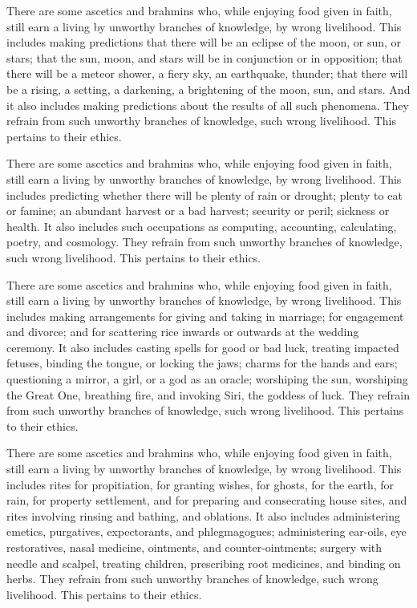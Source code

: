 \documentclass[12pt,openany]{book}%
\begin{document}
There are some ascetics and brahmins who, while enjoying food given in faith, still earn a living by unworthy branches of knowledge, by wrong livelihood. This includes making predictions that there will be an eclipse of the moon, or sun, or stars; that the sun, moon, and stars will be in conjunction or in opposition; that there will be a meteor shower, a fiery sky, an earthquake, thunder; that there will be a rising, a setting, a darkening, a brightening of the moon, sun, and stars. And it also includes making predictions about the results of all such phenomena. They refrain from such unworthy branches of knowledge, such wrong livelihood. This pertains to their ethics. 

There are some ascetics and brahmins who, while enjoying food given in faith, still earn a living by unworthy branches of knowledge, by wrong livelihood. This includes predicting whether there will be plenty of rain or drought; plenty to eat or famine; an abundant harvest or a bad harvest; security or peril; sickness or health. It also includes such occupations as computing, accounting, calculating, poetry, and cosmology. They refrain from such unworthy branches of knowledge, such wrong livelihood. This pertains to their ethics. 

There are some ascetics and brahmins who, while enjoying food given in faith, still earn a living by unworthy branches of knowledge, by wrong livelihood. This includes making arrangements for giving and taking in marriage; for engagement and divorce; and for scattering rice inwards or outwards at the wedding ceremony. It also includes casting spells for good or bad luck, treating impacted fetuses, binding the tongue, or locking the jaws; charms for the hands and ears; questioning a mirror, a girl, or a god as an oracle; worshiping the sun, worshiping the Great One, breathing fire, and invoking Siri, the goddess of luck. They refrain from such unworthy branches of knowledge, such wrong livelihood. This pertains to their ethics. 

There are some ascetics and brahmins who, while enjoying food given in faith, still earn a living by unworthy branches of knowledge, by wrong livelihood. This includes rites for propitiation, for granting wishes, for ghosts, for the earth, for rain, for property settlement, and for preparing and consecrating house sites, and rites involving rinsing and bathing, and oblations. It also includes administering emetics, purgatives, expectorants, and phlegmagogues; administering ear-oils, eye restoratives, nasal medicine, ointments, and counter-ointments; surgery with needle and scalpel, treating children, prescribing root medicines, and binding on herbs. They refrain from such unworthy branches of knowledge, such wrong livelihood. This pertains to their ethics. 
\end{document}
